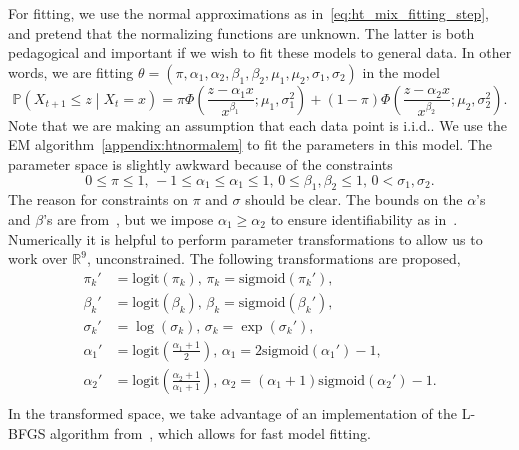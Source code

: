 \documentclass[11pt,twoside,openany]{book}
\newcommand{\prob}{\mathbb{P}}
\newcommand{\reals}{\mathbb{R}}
\numberwithin{Theorem}{chapter}
\numberwithin{Definition}{chapter}
\numberwithin{Lemma}{chapter}
\numberwithin{Algorithm}{chapter}
\numberwithin{equation}{chapter}
\begin{document}
For fitting, we use the normal approximations as
in~\eqref{eq:ht_mix_fitting_step}, and pretend that the normalizing
functions are unknown. The latter is both pedagogical and important if we wish
to fit these models to general data. In other words, we are fitting
$\theta=(\pi,\alpha_1,\alpha_2,\beta_1,\beta_2,\mu_1,\mu_2,\sigma_1,\sigma_2)$
in the model
\[
  \prob\left(X_{t+1}\leq z\middle| X_{t} = x\right)
  =  \pi \Phi\left(\frac{z - \alpha_1 x}{x^{\beta_1}};\mu_1,\sigma_1^2\right)
  +  (1-\pi) \Phi\left(\frac{z - \alpha_2 x}{x^{\beta_2}};\mu_2,\sigma_2^2\right).
\]
Note that we are making an assumption that each data point is i.i.d..
We use the EM algorithm~\ref{appendix:htnormalem} to fit the parameters in this model. The parameter space is slightly awkward because of the constraints
\begin{equation}\label{eq:constraints_k_2}
  0 \leq \pi \leq 1,\, -1 \leq \alpha_1\leq\alpha_1 \leq 1,\,
  0 \leq \beta_1,\beta_2 \leq 1,\, 0 < \sigma_1,\sigma_2.
\end{equation}
The reason for constraints on $\pi$ and $\sigma$ should be clear.
The bounds on the $\alpha$'s and $\beta$'s are from~\cite{keef2013estimation},
but we impose $\alpha_1\geq\alpha_2$ to ensure identifiability as in~\cite{tendijck2021modeling}.
Numerically it is helpful to perform parameter transformations to allow
us to work over $\reals^9$, unconstrained. The following transformations
are proposed,
\begin{equation}\label{eq:htconstr}
  \begin{split}
  \pi_k' &= \text{logit}(\pi_k),\,\pi_k = \text{sigmoid}(\pi_k'),\\
  \beta_k' &= \text{logit}(\beta_k),\,\beta_k = \text{sigmoid}(\beta_k'),\\
  \sigma_k' &= \log(\sigma_k),\,\sigma_k = \exp(\sigma_k'),\\
  \alpha_1' &= \text{logit}\left(\frac{\alpha_1 + 1}{2}\right),\,\alpha_1 = 2\text{sigmoid}(\alpha_1') - 1,\\
  \alpha_2' &= \text{logit}\left(\frac{\alpha_2 + 1}{\alpha_1 + 1}\right),\,
  \alpha_2 = (\alpha_1 + 1)\text{sigmoid}(\alpha_2') - 1.\\
\end{split}
\end{equation}
In the transformed space, we take advantage of
an implementation of the L-BFGS algorithm from~\cite{mogensen2018optim}, which
allows for fast model fitting.
\end{document}
